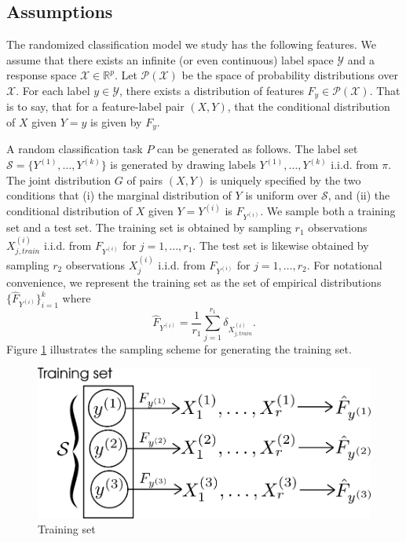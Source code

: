 \subsection{Assumptions}

The randomized classification model we study has the following
features.  We assume that there exists an infinite (or even
continuous) label space $\mathcal{Y}$ and a response space
$\mathcal{X} \in \mathbb{R}^p$.  Let $\mathcal{P}(\mathcal{X})$ be the space of probability distributions over $\mathcal{X}$. For each label $y \in \mathcal{Y}$,
there exists a distribution of features $F_y \in \mathcal{P}(\mathcal{X})$.  That is to say, that
for a feature-label pair $(X, Y)$, that the conditional distribution
of $X$ given $Y = y$ is given by $F_y$.  

A random classification task $P$ can be generated as follows.  The
label set $\mathcal{S} = \{Y^{(1)},\hdots, Y^{(k)}\}$ is generated by
drawing labels $Y^{(1)},\hdots, Y^{(k)}$ i.i.d. from $\pi$.  The joint
distribution $G$ of pairs $(X, Y)$ is uniquely specified by the two
conditions that (i) the marginal distribution of $Y$ is uniform over
$\mathcal{S}$, and (ii) the conditional distribution of $X$ given
$Y=Y^{(i)}$ is $F_{Y^{(i)}}$.  We sample both a training set and a
test set.  The training set is obtained by sampling $r_1$ observations
$X_{j, train}^{(i)}$ i.i.d. from $F_{Y^{(i)}}$ for $j = 1,\hdots,
r_1$.  The test set is likewise obtained by sampling $r_2$
observations $X_j^{(i)}$ i.i.d. from $F_{Y^{(i)}}$ for $j = 1,\hdots,
r_2$.  For notational convenience, we represent the training set as
the set of empirical distributions $\{\hat{F}_{Y^{(i)}}\}_{i=1}^k$
where
\[
\hat{F}_{Y^{(i)}} = \frac{1}{r_1} \sum_{j=1}^{r_1} \delta_{X^{(i)}_{j, train}}.
\]
Figure \ref{fig:training_set} illustrates the sampling scheme for
generating the training set.

\begin{figure}[h]
\centering
\includegraphics[scale = 0.4]{../extrapolation_figures/training_set.png}
\caption{Training set}\label{fig:training_set}
\end{figure}

